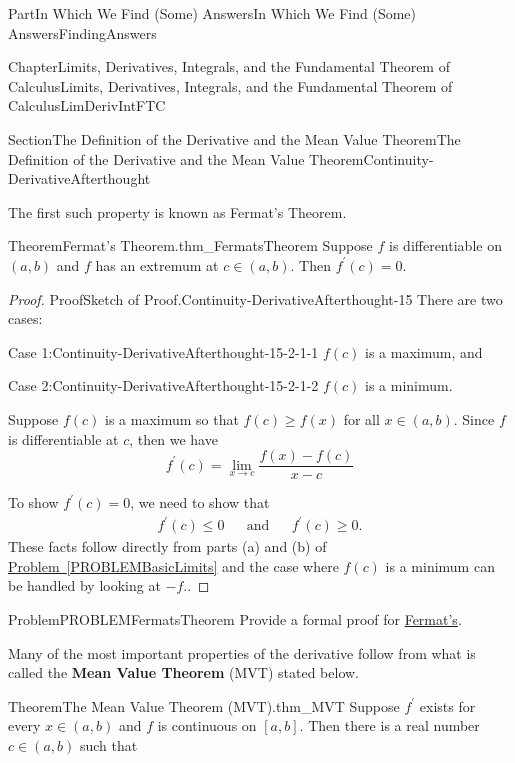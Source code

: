 \documentclass[oneside,10pt,]{book}
\newcommand{\xreffont}{\relax}
\DeclareRobustCommand{\initialismintitle}[1]{\texorpdfstring{#1}{#1}}
\newcommand{\terminology}[1]{\textbf{#1}}
\numberwithin{equation}{part}
\def\limit#1#2#3{{\displaystyle\lim_{#1\rightarrow #2}#3}}
\newcommand{\amp}{&}
\begin{document}
\begin{partptx}{Part}{In Which We Find (Some) Answers}{}{In Which We Find (Some) Answers}{}{}{FindingAnswers}
\begin{chapterptx}{Chapter}{Limits, Derivatives, Integrals, and the Fundamental Theorem of Calculus}{}{Limits, Derivatives, Integrals, and the Fundamental Theorem of Calculus}{}{}{LimDerivIntFTC}
\begin{sectionptx}{Section}{The Definition of  the Derivative and the Mean Value Theorem}{}{The Definition of  the Derivative and the Mean Value Theorem}{}{}{Continuity-DerivativeAfterthought}
\par
The first such property is known as Fermat's Theorem.%
\begin{theorem}{Theorem}{Fermat's   Theorem.}{}{thm_FermatsTheorem}%
%
Suppose \(f\) is differentiable on \((a,b)\) and \(f\) has an extremum at \(c\in (a,b)\).  Then \(f^\prime\left(c\right)=0\).%
\end{theorem}
\begin{proof}{Proof}{Sketch of Proof.}{Continuity-DerivativeAfterthought-15}
There are two cases:%
\begin{descriptionlist}
\begin{dlimedium}{Case 1:}{Continuity-DerivativeAfterthought-15-2-1-1}%
\(f(c)\) is a maximum, and%
\end{dlimedium}%
\begin{dlimedium}{Case 2:}{Continuity-DerivativeAfterthought-15-2-1-2}%
\(f(c)\) is a minimum.%
\end{dlimedium}%
\end{descriptionlist}
%
\par
Suppose \(f(c)\) is a maximum so that \(f\left(c\right)\ge f(x)\) for all \(x\in (a,b)\).  Since \(f\) is differentiable at \(c\), then we have%
\begin{equation*}
f^\prime\left(c\right)=\limit{x}{c}{ \frac{f(x)-f(c)}{x-c}}
\end{equation*}
%
\par
To show \(f^\prime\left(c\right)=0\), we need to show that%
\begin{align*}
f^\prime\left(c\right)\le 0 \amp{}\amp{} \text{and}\amp{}\amp{}
f^\prime\left(c\right)\ge 0.
\end{align*}
These facts follow directly from parts (a) and (b) of \hyperref[PROBLEMBasicLimits]{Problem~{\xreffont\ref{PROBLEMBasicLimits}}} and the case where \(f(c)\) is a minimum can be handled by looking at \(-f\)..        %
\end{proof}
\begin{problem}{Problem}{}{PROBLEMFermatsTheorem}%
Provide a formal proof for \hyperref[thm_FermatsTheorem]{Fermat's}.%
\end{problem}
Many of the most important properties of the derivative follow from what is called the \terminology{Mean Value Theorem} (MVT) stated below.%
\begin{theorem}{Theorem}{The Mean Value Theorem (\initialismintitle{MVT}).}{}{thm_MVT}%
%
Suppose \(f^\prime\) exists for every \(x\in(a,b)\) and \(f\) is continuous on \([a,b]\).  Then there is a real number \(c\in(a,b)\) such that%

\end{theorem}
\end{sectionptx}
\end{chapterptx}
\end{partptx}
\end{document}

